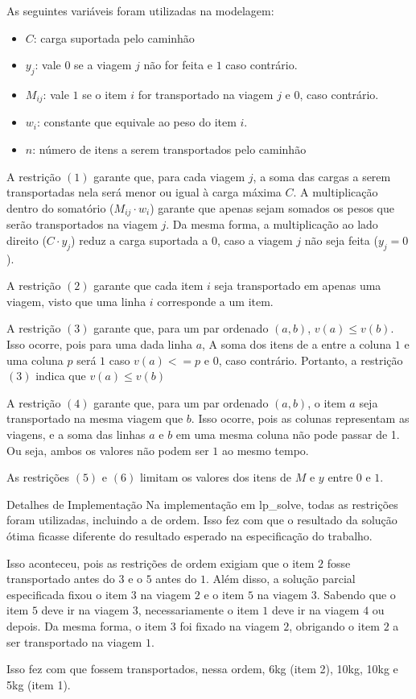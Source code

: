 \documentclass{article}
\begin{document}
As seguintes variáveis foram utilizadas na modelagem:
\begin{itemize}
    \item $C$: carga suportada pelo caminhão
    
    \item $y_j$: vale $0$ se a viagem $j$ não for feita e $1$ caso contrário.

    \item $M_{ij}$: vale $1$ se o item $i$ for transportado na viagem $j$
    e $0$, caso contrário.

    \item $w_i$: constante que equivale ao peso do item $i$.
    
    \item $n$: número de itens a serem transportados pelo caminhão
\end{itemize}

A restrição $(1)$ garante que, para cada viagem $j$, a soma das cargas a serem transportadas nela será menor ou igual à carga máxima $C$. A multiplicação dentro do somatório ($M_{ij} \cdot w_i$) garante que apenas sejam somados os pesos que serão transportados na viagem $j$. Da mesma forma, a multiplicação ao lado direito ($C \cdot y_j$) reduz a carga suportada a $0$, caso a viagem $j$ não seja feita ($y_j = 0$).

A restrição $(2)$ garante que cada item $i$ seja transportado em apenas uma viagem, visto que uma linha $i$ corresponde a um item.

A restrição $(3)$ garante que, para um par ordenado $(a,b)$, $v(a) \le v(b)$. Isso ocorre, pois para uma dada linha $a$, A soma dos itens de a entre a coluna $1$ e uma coluna $p$ será $1$ caso $v(a) <= p$ e $0$, caso contrário. Portanto, a restrição $(3)$ indica que $v(a) \le v(b)$

A restrição $(4)$ garante que, para um par ordenado $(a,b)$, o item $a$ seja transportado na mesma viagem que $b$. Isso ocorre, pois as colunas representam as viagens, e a soma das linhas $a$ e $b$ em uma mesma coluna não pode passar de 1. Ou seja, ambos os valores não podem ser $1$ ao mesmo tempo.

As restrições $(5)$ e $(6)$ limitam os valores dos itens de $M$ e $y$
entre $0$ e $1$.

\begin{section}{Detalhes de Implementação}
    Na implementação em lp\_solve, todas as restrições foram utilizadas, incluindo a de ordem. Isso fez com que o resultado da solução ótima ficasse diferente do resultado esperado na especificação do trabalho.

    Isso aconteceu, pois as restrições de ordem exigiam que o item $2$ fosse transportado antes do $3$ e o $5$ antes do $1$. Além disso, a solução parcial especificada fixou o item $3$ na viagem $2$ e o item $5$ na viagem $3$. Sabendo que o item $5$ deve ir na viagem $3$, necessariamente o item $1$ deve ir na viagem $4$ ou depois. Da mesma forma, o item $3$ foi fixado na viagem $2$, obrigando o item $2$ a ser transportado na viagem $1$.

    Isso fez com que fossem transportados, nessa ordem, 6kg (item 2), 10kg, 10kg e 5kg (item 1). 
\end{section}
\end{document}
